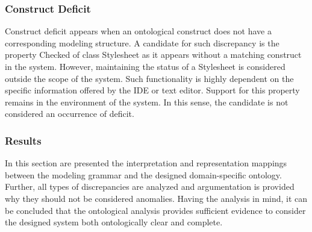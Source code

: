 \subsubsection{Construct Deficit}

Construct deficit appears when an ontological construct does not have a
corresponding modeling structure. A candidate for such discrepancy is the
property Checked of class Stylesheet as it appears without a matching
construct in the system. However, maintaining the status of a Stylesheet is
considered outside the scope of the system. Such functionality is highly
dependent on the specific information offered by the IDE or text editor.
Support for this property remains in the environment of the system. In this
sense, the candidate is not considered an occurrence of deficit.


\subsubsection{Results}

In this section are presented the interpretation and representation mappings
between the modeling grammar and the designed domain-specific ontology.
Further, all types of discrepancies are analyzed and argumentation is provided
why they should not be considered anomalies. Having the analysis in mind, it
can be concluded that the ontological analysis provides sufficient evidence to
consider the designed system both ontologically clear and complete.
